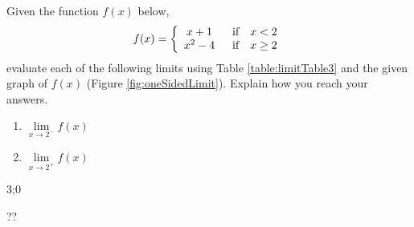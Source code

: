 \begin{example}\label{exOneSidedLimit}
Given the function $f(x)$ below, 
\begin{align*}
f(x) = \left\{ \begin{array}{cc} 
                x+1 & \hspace{2mm} \textrm{if} \quad x<2 \\
                x^2-4 & \hspace{2mm} \textrm{if} \quad x\ge 2 \\
                \end{array} \right.
\end{align*}
evaluate each of the following limits using Table \ref{table:limitTable3} and the given graph of $f(x)$ (Figure \ref{fig:oneSidedLimit}). Explain how you reach your answers.
\begin{multicols}{2}

\begin{enumerate}[leftmargin=*]
   \item $\lim\limits_{x \to 2^-}f(x)$
    \item $\lim\limits_{x \to 2^+}f(x)$
\end{enumerate}

\end{multicols}
    \begin{sol}
      3;0
    \end{sol}
    \begin{solL}
    ??
    
    \end{solL}
    
\end{example}

